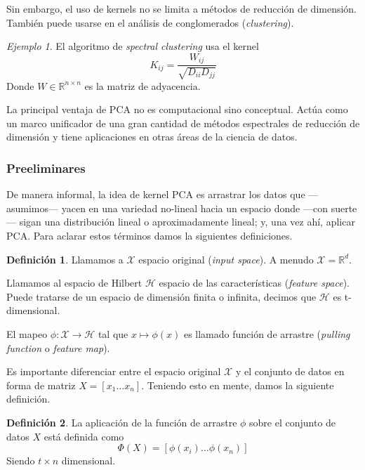 \documentclass{article}
\numberwithin{equation}{section}
\theoremstyle{remark}
\newtheorem{example}{Ejemplo}
\theoremstyle{definition}
\newtheorem{definition}{Definición}
\theoremstyle{remark}
\theoremstyle{remark}
\begin{document}
Sin embargo, el uso de kernels no se limita a métodos de reducción de dimensión. También 
puede usarse en el análisis de conglomerados (\textit{clustering}). 
\begin{example}
    \label{ex:kpca_spectral_clustering}
    El algoritmo de \textit{spectral clustering} usa el kernel
    $$K_{ij} = \frac{W_{ij}}{\sqrt{D_{ii} D_{jj}}}$$
    Donde $W \in \mathbb{R}^{n \times n}$ es la matriz de adyacencia.
\end{example}

La principal ventaja de PCA no es computacional sino conceptual. Actúa como un marco unificador
de una gran cantidad de métodos espectrales de reducción de dimensión y tiene aplicaciones
en otras áreas de la ciencia de datos. 


\subsubsection{Preeliminares}
\label{ss:preelim}
De manera informal, la idea de kernel PCA es arrastrar los datos que ---asumimos--- yacen en una
variedad no-lineal hacia un espacio donde ---con suerte--- sigan una distribución lineal o 
aproximadamente lineal; y, una vez ahí, aplicar PCA. Para aclarar estos términos damos la siguientes
definiciones.

\begin{definition}
    Llamamos a $\mathcal{X}$ espacio original (\textit{input space}). 
    A menudo $\mathcal{X} = \mathbb{R}^d$.

    Llamamos al espacio de Hilbert $\mathcal{H}$ espacio de las características (\textit{feature space}).
    Puede tratarse de un espacio de dimensión finita o infinita, decimos que $\mathcal{H}$ es 
    t-dimensional.

    El mapeo $\phi: \mathcal{X} \to \mathcal{H}$ tal que $x \mapsto \phi(x)$ es llamado función 
    de arrastre (\textit{pulling function} o \textit{feature map}).
\end{definition}

Es importante diferenciar entre el espacio original $\mathcal{X}$ y el conjunto de datos en forma
de matriz $X = [x_1 \ldots x_n]$. Teniendo esto en mente, damos la siguiente definición.

\begin{definition}
    \label{eq:pulling_function_on_dataset}
    La aplicación de la función de arrastre $\phi$ sobre el conjunto de datos $X$ está definida como
    \begin{equation}
    \Phi(X) = [\phi(x_i) \ldots \phi(x_n)]
    \end{equation}
    Siendo $t \times n$ dimensional.
\end{definition}
\end{document}
